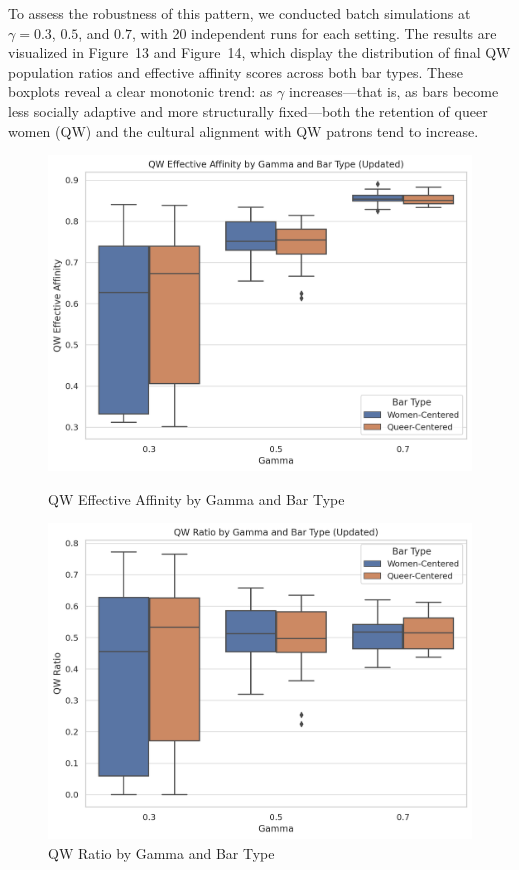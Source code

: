 \documentclass{article}
\begin{document}
To assess the robustness of this pattern, we conducted batch simulations at $\gamma = 0.3$, $0.5$, and $0.7$, with 20 independent runs for each setting. The results are visualized in Figure~13 and Figure~14, which display the distribution of final QW population ratios and effective affinity scores across both bar types. These boxplots reveal a clear monotonic trend: as $\gamma$ increases—that is, as bars become less socially adaptive and more structurally fixed—both the retention of queer women (QW) and the cultural alignment with QW patrons tend to increase.


\begin{figure}[H]
\centering
\begin{minipage}{0.48\textwidth}
  \centering
  \includegraphics[width=\linewidth]{figures/batch ea.png}
  \caption{QW Effective Affinity by Gamma and Bar Type}
\end{minipage}
\hfill
\begin{minipage}{0.48\textwidth}
  \centering
  \includegraphics[width=\linewidth]{figures/batch ratio.png}
  \caption{QW Ratio by Gamma and Bar Type}
\end{minipage}
\end{figure}
\end{document}
